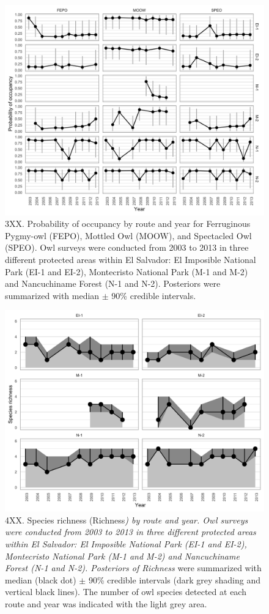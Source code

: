 \documentclass[
]{article}
\begin{document}
\begin{figure}
\centering
\includegraphics{../output/figures/psi_byYr-1.png}
\caption{3XX. Probability of occupancy by route and year for Ferruginous
Pygmy-owl (FEPO), Mottled Owl (MOOW), and Spectacled Owl (SPEO). Owl
surveys were conducted from 2003 to 2013 in three different protected
areas within El Salvador: El Imposible National Park (EI-1 and EI-2),
Montecristo National Park (M-1 and M-2) and Nancuchiname Forest (N-1 and
N-2). Posteriors were summarized with median \(\pm\) 90\% credible
intervals. \label{figure2}}
\end{figure}

\begin{figure}
\centering
\includegraphics{../output/figures/richness_byRtYr-1.png}
\caption{4XX. Species richness (Richness\emph{) by route and year. Owl
surveys were conducted from 2003 to 2013 in three different protected
areas within El Salvador: El Imposible National Park (EI-1 and EI-2),
Montecristo National Park (M-1 and M-2) and Nancuchiname Forest (N-1 and
N-2). Posteriors of Richness} were summarized with median (black dot)
\(\pm\) 90\% credible intervals (dark grey shading and vertical black
lines). The number of owl species detected at each route and year was
indicated with the light grey area. \label{figure5}}
\end{figure}
\end{document}
